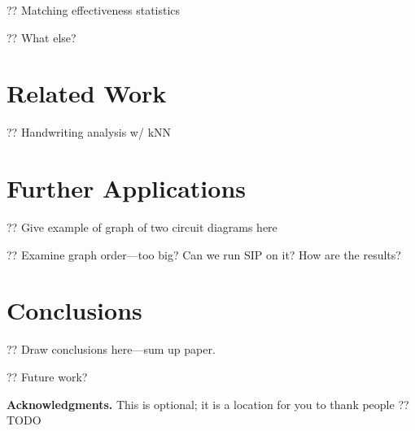 \documentclass{mpaper}
\begin{document}
?? Matching effectiveness statistics

?? What else?

\section{Related Work}
\label{sec:related}

?? Handwriting analysis w/ kNN \cite{Graphs-Handwriting}

\section{Further Applications}
\label{sec:applications}

?? Give example of graph of two circuit diagrams here

?? Examine graph order---too big? Can we run SIP on it? How are the results?

\section{Conclusions}
\label{sec:conclusion}

?? Draw conclusions here---sum up paper.

?? Future work?

\noindent
{\bf Acknowledgments.}
This is optional; it is a location for you to thank people ?? TODO

\printbibliography
\end{document}
